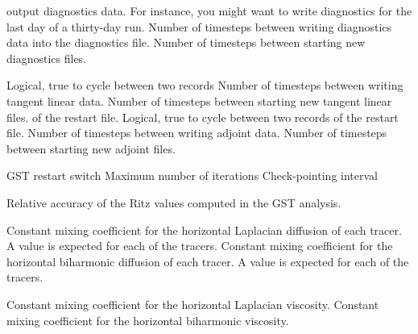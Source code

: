 \begin{klist}
\begin{klist}
     output diagnostics data.  For instance, you might want to write
     diagnostics for the last day of a thirty-day run.
             Number of timesteps between writing
     diagnostics data into the diagnostics file.
             Number of timesteps between starting
     new diagnostics files.
     \end{klist}
     \begin{klist}
        Logical, true to cycle between two records
             Number of timesteps between writing
     tangent linear data.
             Number of timesteps between starting
     new tangent linear files.
     of the restart file.
        Logical, true to cycle between two records
     of the restart file.
             Number of timesteps between writing
     adjoint data.
             Number of timesteps between starting
     new adjoint files.
     \end{klist}
     \begin{klist}
        GST restart switch
        Maximum number of iterations
        Check-pointing interval
     \end{klist}
     \begin{klist}
        Relative accuracy of the Ritz values
       computed in the GST analysis.
     \end{klist}
     \begin{klist}
            Constant mixing
     coefficient for the horizontal Laplacian diffusion of each tracer.
     A value is expected for each of the  tracers.
            Constant mixing
     coefficient for the horizontal biharmonic diffusion of each tracer.
     A value is expected for each of the  tracers.
     \end{klist}
     \begin{klist}
           Constant mixing coefficient for the horizontal
     Laplacian viscosity.
           Constant mixing coefficient for the horizontal
     biharmonic viscosity.
     \end{klist}

\end{klist}
